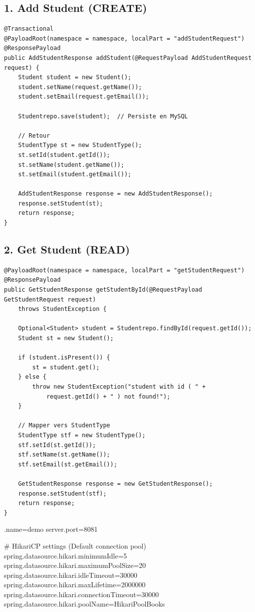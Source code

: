 \documentclass[12pt,a4paper]{report}
\begin{document}
\subsection{1. Add Student (CREATE)}
\begin{lstlisting}
@Transactional
@PayloadRoot(namespace = namespace, localPart = "addStudentRequest")
@ResponsePayload
public AddStudentResponse addStudent(@RequestPayload AddStudentRequest request) {
    Student student = new Student();
    student.setName(request.getName());
    student.setEmail(request.getEmail());
    
    Studentrepo.save(student);  // Persiste en MySQL
    
    // Retour
    StudentType st = new StudentType();
    st.setId(student.getId());
    st.setName(student.getName());
    st.setEmail(student.getEmail());
    
    AddStudentResponse response = new AddStudentResponse();
    response.setStudent(st);
    return response;
}
\end{lstlisting}

\subsection{2. Get Student (READ)}
\begin{lstlisting}
@PayloadRoot(namespace = namespace, localPart = "getStudentRequest")
@ResponsePayload
public GetStudentResponse getStudentById(@RequestPayload GetStudentRequest request) 
    throws StudentException {
    
    Optional<Student> student = Studentrepo.findById(request.getId());
    Student st = new Student();
    
    if (student.isPresent()) {
        st = student.get();
    } else {
        throw new StudentException("student with id ( " + 
            request.getId() + " ) not found!");
    }
    
    // Mapper vers StudentType
    StudentType stf = new StudentType();
    stf.setId(st.getId());
    stf.setName(st.getName());
    stf.setEmail(st.getEmail());
    
    GetStudentResponse response = new GetStudentResponse();
    response.setStudent(stf);
    return response;
}
\end{lstlisting}

\newpagapplication.name=demo
server.port=8081

# HikariCP settings (Default connection pool)
spring.datasource.hikari.minimumIdle=5
spring.datasource.hikari.maximumPoolSize=20
spring.datasource.hikari.idleTimeout=30000
spring.datasource.hikari.maxLifetime=2000000
spring.datasource.hikari.connectionTimeout=30000
spring.datasource.hikari.poolName=HikariPoolBooks
\end{document}
